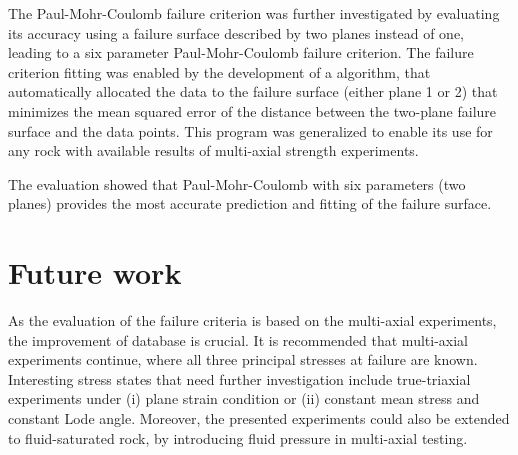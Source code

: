The Paul-Mohr-Coulomb failure criterion was further investigated by evaluating its accuracy using a failure surface described by two planes instead of one, leading to a six parameter Paul-Mohr-Coulomb failure criterion. The failure criterion fitting was enabled by the development of a algorithm, that automatically allocated the data to the failure surface (either plane 1 or 2) that minimizes the mean squared error of the distance between the two-plane failure surface and the data points. This program was generalized to enable its use for any rock with available results of multi-axial strength experiments. 

The evaluation showed that Paul-Mohr-Coulomb with six parameters (two planes) provides the most accurate prediction and fitting of the failure surface.

\section{Future work}

As the evaluation of the failure criteria is based on the multi-axial experiments, the improvement of database is crucial. It is recommended that multi-axial experiments continue, where all three principal stresses at failure are known. Interesting stress states that need further investigation include true-triaxial experiments under (i) plane strain condition or (ii) constant mean stress and constant Lode angle. Moreover, the presented experiments could also be extended to fluid-saturated rock, by introducing fluid pressure in multi-axial testing.  